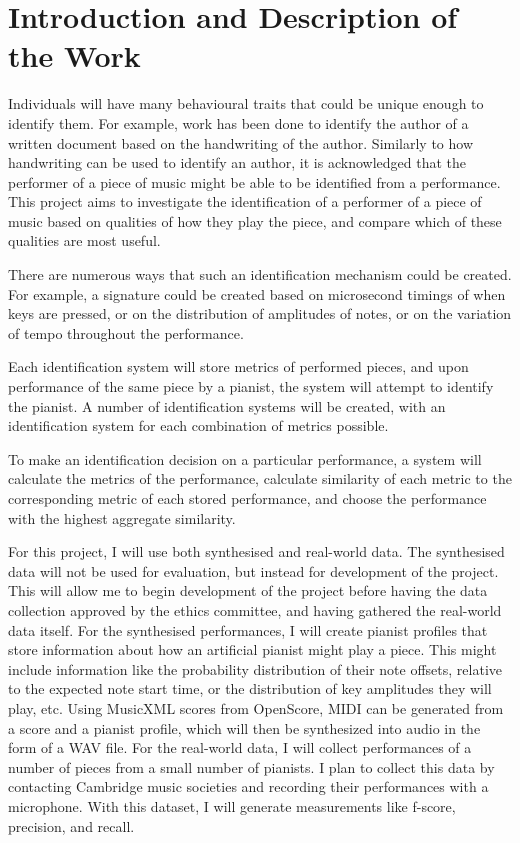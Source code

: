 \documentclass[12pt]{article}
\begin{document}

\section{Introduction and Description of the Work}

Individuals will have many behavioural traits that could be unique enough to identify them. For example, work has been done to identify the author of a written document based on the handwriting of the author. Similarly to how handwriting can be used to identify an author, it is acknowledged that the performer of a piece of music might be able to be identified from a performance. This project aims to investigate the identification of a performer of a piece of music based on qualities of how they play the piece, and compare which of these qualities are most useful.

There are numerous ways that such an identification mechanism could be created. For example, a signature could be created based on microsecond timings of when keys are pressed, or on the distribution of amplitudes of notes, or on the variation of tempo throughout the performance.

Each identification system will store metrics of performed pieces, and upon performance of the same piece by a pianist, the system will attempt to identify the pianist. A number of identification systems will be created, with an identification system for each combination of metrics possible.

To make an identification decision on a particular performance, a system will calculate the metrics of the performance, calculate similarity of each metric to the corresponding metric of each stored performance, and choose the performance with the highest aggregate similarity.

For this project, I will use both synthesised and real-world data. The synthesised data will not be used for evaluation, but instead for development of the project. This will allow me to begin development of the project before having the data collection approved by the ethics committee, and having gathered the real-world data itself. For the synthesised performances, I will create pianist profiles that store information about how an artificial pianist might play a piece. This might include information like the probability distribution of their note offsets, relative to the expected note start time, or the distribution of key amplitudes they will play, etc. Using MusicXML scores from OpenScore, MIDI can be generated from a score and a pianist profile, which will then be synthesized into audio in the form of a WAV file. For the real-world data, I will collect performances of a number of pieces from a small number of pianists. I plan to collect this data by contacting Cambridge music societies and recording their performances with a microphone. With this dataset, I will generate measurements like f-score, precision, and recall.
\end{document}
